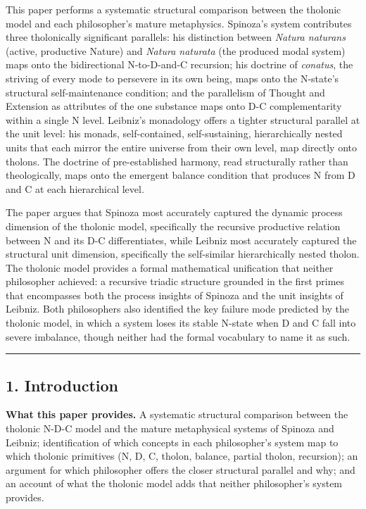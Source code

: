 \documentclass[
  11pt,
  letterpaper,
]{article}
\begin{document}
This paper performs a systematic structural comparison between the
tholonic model and each philosopher's mature metaphysics. Spinoza's
system contributes three tholonically significant parallels: his
distinction between \emph{Natura naturans} (active, productive Nature)
and \emph{Natura naturata} (the produced modal system) maps onto the
bidirectional N-to-D-and-C recursion; his doctrine of \emph{conatus},
the striving of every mode to persevere in its own being, maps onto the
N-state's structural self-maintenance condition; and the parallelism of
Thought and Extension as attributes of the one substance maps onto D-C
complementarity within a single N level. Leibniz's monadology offers a
tighter structural parallel at the unit level: his monads,
self-contained, self-sustaining, hierarchically nested units that each
mirror the entire universe from their own level, map directly onto
tholons. The doctrine of pre-established harmony, read structurally
rather than theologically, maps onto the emergent balance condition that
produces N from D and C at each hierarchical level.

The paper argues that Spinoza most accurately captured the dynamic
process dimension of the tholonic model, specifically the recursive
productive relation between N and its D-C differentiates, while Leibniz
most accurately captured the structural unit dimension, specifically the
self-similar hierarchically nested tholon. The tholonic model provides a
formal mathematical unification that neither philosopher achieved: a
recursive triadic structure grounded in the first primes that
encompasses both the process insights of Spinoza and the unit insights
of Leibniz. Both philosophers also identified the key failure mode
predicted by the tholonic model, in which a system loses its stable
N-state when D and C fall into severe imbalance, though neither had the
formal vocabulary to name it as such.

\begin{center}\rule{0.5\linewidth}{0.5pt}\end{center}

\subsection{1. Introduction}\label{introduction}

\textbf{What this paper provides.} A systematic structural comparison
between the tholonic N-D-C model and the mature metaphysical systems of
Spinoza and Leibniz; identification of which concepts in each
philosopher's system map to which tholonic primitives (N, D, C, tholon,
balance, partial tholon, recursion); an argument for which philosopher
offers the closer structural parallel and why; and an account of what
the tholonic model adds that neither philosopher's system provides.
\end{document}
